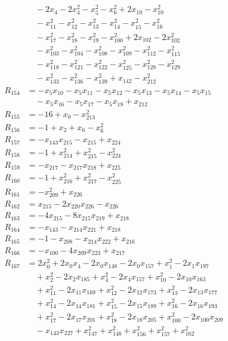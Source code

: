 \begin{align*}
&\quad{}-2x_{4}-2x_{4}^{2}-x_{5}^{2}-x_{6}^{2}+2x_{10}-x_{10}^{2}\\
&\quad{}-x_{11}^{2}-x_{12}^{2}-x_{13}^{2}-x_{14}^{2}-x_{15}^{2}-x_{16}^{2}\\
&\quad{}-x_{17}^{2}-x_{18}^{2}-x_{19}^{2}-x_{100}^{2}+2x_{102}-2x_{102}^{2}\\
&\quad{}-x_{103}^{2}-x_{104}^{2}-x_{108}^{2}-x_{109}^{2}-x_{112}^{2}-x_{115}^{2}\\
&\quad{}-x_{118}^{2}-x_{121}^{2}-x_{122}^{2}-x_{125}^{2}-x_{128}^{2}-x_{129}^{2}\\
&\quad{}-x_{133}^{2}-x_{136}^{2}-x_{139}^{2}+x_{142}-x_{212}^{2}\\
R_{154}&=-x_{5}x_{10}-x_{5}x_{11}-x_{5}x_{12}-x_{5}x_{13}-x_{5}x_{14}-x_{5}x_{15}\\
&\quad{}-x_{5}x_{16}-x_{5}x_{17}-x_{5}x_{18}+x_{212}\\
R_{155}&=-16+x_{0}-x_{213}^{2}\\
R_{156}&=-1+x_{2}+x_{6}-x_{6}^{2}\\
R_{157}&=-x_{143}x_{215}-x_{215}+x_{224}\\
R_{158}&=-1+x_{214}^{2}+x_{215}^{2}-x_{224}^{2}\\
R_{159}&=-x_{217}-x_{217}x_{218}+x_{225}\\
R_{160}&=-1+x_{216}^{2}+x_{217}^{2}-x_{225}^{2}\\
R_{161}&=-x_{209}^{2}+x_{226}\\
R_{162}&=x_{215}-2x_{220}x_{226}-x_{226}\\
R_{163}&=-4x_{215}-8x_{215}x_{219}+x_{218}\\
R_{164}&=-x_{143}-x_{214}x_{221}+x_{218}\\
R_{165}&=-1-x_{208}-x_{214}x_{222}+x_{216}\\
R_{166}&=-x_{100}-4x_{209}x_{223}+x_{217}\\
R_{167}&=2x_{0}^{2}+2x_{0}x_{4}-2x_{0}x_{148}-2x_{0}x_{157}+x_{1}^{2}-2x_{1}x_{197}\\
&\quad{}+x_{2}^{2}-2x_{2}x_{185}+x_{4}^{2}-2x_{4}x_{157}+x_{10}^{2}-2x_{10}x_{163}\\
&\quad{}+x_{11}^{2}-2x_{11}x_{169}+x_{12}^{2}-2x_{12}x_{173}+x_{13}^{2}-2x_{13}x_{177}\\
&\quad{}+x_{14}^{2}-2x_{14}x_{181}+x_{15}^{2}-2x_{15}x_{189}+x_{16}^{2}-2x_{16}x_{193}\\
&\quad{}+x_{17}^{2}-2x_{17}x_{201}+x_{18}^{2}-2x_{18}x_{205}+x_{100}^{2}-2x_{100}x_{209}\\
&\quad{}-x_{143}x_{227}+x_{147}^{2}+x_{148}^{2}+x_{156}^{2}+x_{157}^{2}+x_{162}^{2}\\

\end{align*}
